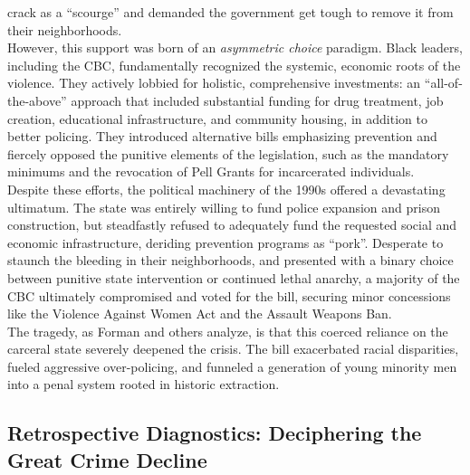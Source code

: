\documentclass[
]{article}
\begin{document}
crack as a ``scourge'' and demanded the government get tough to remove
it from their neighborhoods.\\
However, this support was born of an \emph{asymmetric choice} paradigm.
Black leaders, including the CBC, fundamentally recognized the systemic,
economic roots of the violence. They actively lobbied for holistic,
comprehensive investments: an ``all-of-the-above'' approach that
included substantial funding for drug treatment, job creation,
educational infrastructure, and community housing, in addition to better
policing. They introduced alternative bills emphasizing prevention and
fiercely opposed the punitive elements of the legislation, such as the
mandatory minimums and the revocation of Pell Grants for incarcerated
individuals.\\
Despite these efforts, the political machinery of the 1990s offered a
devastating ultimatum. The state was entirely willing to fund police
expansion and prison construction, but steadfastly refused to adequately
fund the requested social and economic infrastructure, deriding
prevention programs as ``pork''. Desperate to staunch the bleeding in
their neighborhoods, and presented with a binary choice between punitive
state intervention or continued lethal anarchy, a majority of the CBC
ultimately compromised and voted for the bill, securing minor
concessions like the Violence Against Women Act and the Assault Weapons
Ban.\\
The tragedy, as Forman and others analyze, is that this coerced reliance
on the carceral state severely deepened the crisis. The bill exacerbated
racial disparities, fueled aggressive over-policing, and funneled a
generation of young minority men into a penal system rooted in historic
extraction.

\subsection{\texorpdfstring{\textbf{Retrospective Diagnostics:
Deciphering the Great Crime
Decline}}{Retrospective Diagnostics: Deciphering the Great Crime Decline}}\label{retrospective-diagnostics-deciphering-the-great-crime-decline}
\end{document}
